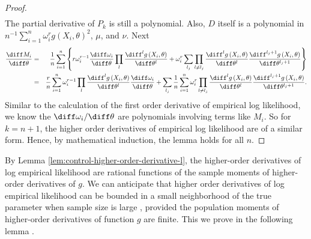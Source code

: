 \begin{proof}
\begin{eqnarray*}
\end{eqnarray*}
The partial derivative of $P_{k}$ is still a polynomial. Also, $D$
itself is a polynomial in $n^{-1}\sum_{i=1}^{n}\omega_{i}^{r}g\left(X_{i},\theta\right)^2$,
$\mu$, and $\nu$. Next 
\begin{eqnarray*}
\frac{\diff M_{i}}{\diff\theta} & = & \frac{1}{n}\sum_{i=1}^{n}\left\{ r\omega_{i}^{r-1}\frac{\diff\omega_{i}}{\diff\theta}\prod_{l}\frac{\diff^{l}g\left(X_{i},\theta\right)}{\diff\theta^{l}}+\omega_{i}^{r}\sum_{l_{j}}\prod_{l\neq l_{j}}\frac{\diff^{l}g\left(X_{i},\theta\right)}{\diff\theta^{l}}\frac{\diff^{l_{j}+1}g\left(X_{i},\theta\right)}{\diff\theta^{l_{j}+1}}\right\} \\
 & = & \frac{r}{n}\sum_{i=1}^{n}\omega_{i}^{r-1}\prod_{l}\frac{\diff^{l}g\left(X_{i},\theta\right)}{\diff\theta^{l}}\frac{\diff\omega_{i}}{\diff\theta}+\sum_{l_{j}}\frac{1}{n}\sum_{i=1}^{n}\omega_{i}^{r}\prod_{l\neq l_{j}}\frac{\diff^{l}g\left(X_{i},\theta\right)}{\diff\theta^{l}}\frac{\diff^{l_{j}+1}g\left(X_{i},\theta\right)}{\diff\theta^{l_{j}+1}}.
\end{eqnarray*}
Similar to the calculation of the first order derivative of empirical
log likelihood, we know the $\diff\omega_{i}/\diff\theta$ are polynomials
involving terms like $M_{i}$. So for $k=n+1$, the higher order derivatives
of empirical log likelihood are of a similar form. Hence, by mathematical
induction, the lemma holds for all $n$. 
\end{proof}
By Lemma \ref{lem:control-higher-order-derivative-l}, the higher-order derivatives of log empirical likelihood are rational functions of the sample moments of higher-order derivatives of  $g$. We can anticipate
that higher order derivatives of log empirical likelihood can be bounded
in a small neighborhood of the true parameter when sample size is
large , provided the population moments of higher-order derivatives of function $g$ are finite. This we prove in the following lemma .


